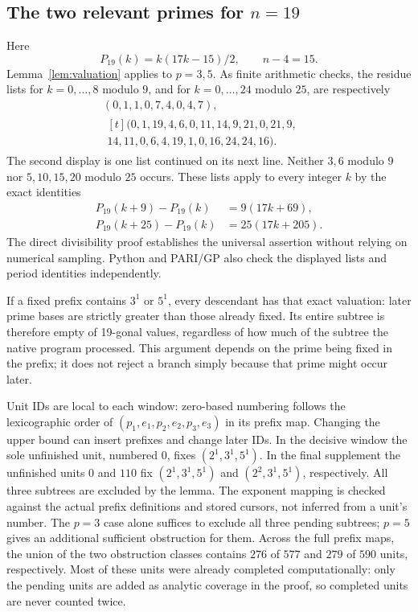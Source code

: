 \documentclass[11pt]{article}
\theoremstyle{remark}
\begin{document}
\subsection{The two relevant primes for \texorpdfstring{$n=19$}{n=19}}
Here
\begin{equation}\label{eq:19}
 P_{19}(k)=k(17k-15)/2,\qquad n-4=15.
\end{equation}
Lemma~\ref{lem:valuation} applies to $p=3,5$. As finite arithmetic checks,
the residue lists for $k=0,\ldots,8$ modulo $9$, and for
$k=0,\ldots,24$ modulo $25$, are respectively
\begin{align}
 &(0,1,1,0,7,4,0,4,7),\label{eq:mod9}\\
 &\begin{aligned}[t]
 (0,1,19,4,6,0,11,14,9,21,0,21,9,\qquad\\
 14,11,0,6,4,19,1,0,16,24,24,16).
 \end{aligned}\label{eq:mod25}
\end{align}
The second display is one list continued on its next line.
Neither $3,6$ modulo $9$ nor $5,10,15,20$ modulo $25$ occurs. These
lists apply to every integer $k$ by the exact identities
\begin{align}
 P_{19}(k+9)-P_{19}(k)&=9(17k+69),\label{eq:period9}\\
 P_{19}(k+25)-P_{19}(k)&=25(17k+205).\label{eq:period25}
\end{align}
The direct divisibility proof establishes the universal assertion without
relying on numerical sampling. Python and PARI/GP also check the displayed
lists and period identities independently.

If a fixed prefix contains $3^1$ or $5^1$, every descendant has that exact
valuation: later prime bases are strictly greater than those already fixed.
Its entire subtree is therefore empty of 19-gonal values, regardless of how
much of the subtree the native program processed. This argument depends on
the prime being fixed in the prefix; it does not reject a branch simply
because that prime might occur later.

Unit IDs are local to each window: zero-based numbering follows the
lexicographic order of $(p_1,e_1,p_2,e_2,p_3,e_3)$ in its prefix map.
Changing the upper bound can insert prefixes and change later IDs.
In the decisive window the sole unfinished unit, numbered $0$,
fixes $(2^1,3^1,5^1)$.
In the final supplement the unfinished units $0$ and $110$ fix
$(2^1,3^1,5^1)$ and $(2^2,3^1,5^1)$, respectively. All three subtrees are
excluded by the lemma. The exponent mapping is checked against the actual
prefix definitions and stored cursors, not inferred from a unit's number.
The $p=3$ case alone suffices to exclude all three pending subtrees;
$p=5$ gives an additional sufficient obstruction for them. Across the
full prefix maps, the union of the two obstruction classes contains
$276$ of $577$ and $279$ of $590$ units, respectively. Most of these units
were already completed computationally: only the pending units are added
as analytic coverage in the proof, so completed units are never counted twice.
\end{document}
